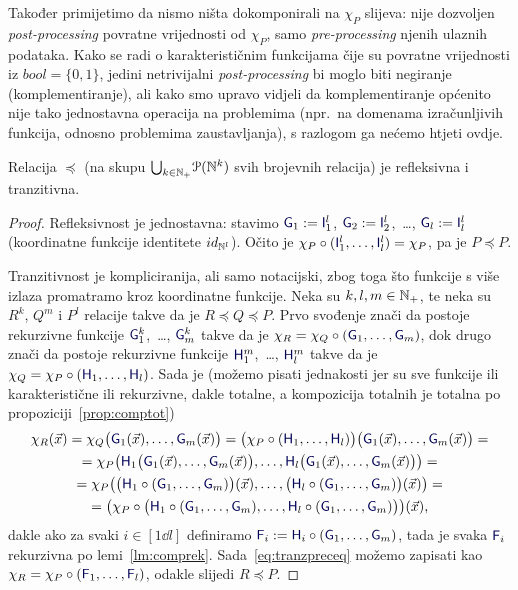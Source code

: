 Također primijetimo da nismo ništa dokomponirali na $\chi_P$ slijeva: nije dozvoljen \emph{post-processing} povratne vrijednosti od $\chi_P$, samo \emph{pre-processing} njenih ulaznih podataka. Kako se radi o karakterističnim funkcijama čije su povratne vrijednosti iz $bool=\{0,1\}$, jedini netrivijalni \emph{post-processing} bi moglo biti negiranje (komplementiranje), ali kako smo upravo vidjeli da komplementiranje općenito nije tako jednostavna operacija na problemima (npr.\ na domenama izračunljivih funkcija, odnosno problemima zaustavljanja), s razlogom ga nećemo htjeti ovdje.

\begin{propozicija}[{name=[refleksivnost i tranzitivnost svedivosti]}]\label{pp:preceqrt}
Relacija $\preceq$ (na skupu $\bigcup_{k\in{\mathbb N}_+}\!\mathcal P({\mathbb N}^k)$ svih brojevnih relacija) je refleksivna i tranzitivna.
\end{propozicija}
\begin{proof}
Refleksivnost je jednostavna: stavimo $\f G_1:=\f I_1^l$, $\f G_2:=\f I_2^l$,~\ldots, $\f G_l:=\f I_l^l$ (koordinatne funkcije identitete $id_{{\mathbb N}^l}$). Očito je $\chi_P\circ(\f I_1^l,\dotsc,\f I_l^l)=\chi_P$, pa je $P\preceq P$.

Tranzitivnost je kompliciranija, ali samo notacijski, zbog toga što funkcije s više izlaza promatramo kroz koordinatne funkcije. Neka su $k,l,m\in{\mathbb N}_+$, te neka su $R^k$, $Q^m$ i $P^l$ relacije takve da je $R\preceq Q\preceq P$. Prvo svođenje znači da postoje rekurzivne funkcije $\f G_1^k$,~\ldots, $\f G_m^k$ takve da je $\chi_R=\chi_Q\circ(\f G_1,\dotsc,\f G_m)$, dok drugo znači da postoje rekurzivne funkcije $\f H_1^m$,~\ldots, $\f H_l^m$ takve da je $\chi_Q=\chi_P\circ(\f H_1,\dotsc,\f H_l)$. Sada je (možemo pisati jednakosti jer su sve funkcije ili karakteristične ili rekurzivne, dakle totalne, a kompozicija totalnih je totalna po propoziciji~\ref{prop:comptot})
\begin{multline}\label{eq:tranzpreceq}
    \chi_R(\vec x)=\chi_Q\bigl(\f G_1(\vec x),\dotsc,\f G_m(\vec x)\bigr)=\bigl(\chi_P\circ(\f H_1,\dotsc,\f H_l)\bigr)\bigl(\f G_1(\vec x),\dotsc,\f G_m(\vec x)\bigr)=\\
    =\chi_P\bigl(
    \f H_1\bigl(\f G_1(\vec x),\dotsc,\f G_m(\vec x)\bigr),\dotsc,
    \f H_l\bigl(\f G_1(\vec x),\dotsc,\f G_m(\vec x)\bigr)
    \bigr)=\\
    =\chi_P\bigl(
    \bigl(\f H_1\circ(\f G_1,\dotsc,\f G_m)\bigr)(\vec x),\dotsc,
    \bigl(\f H_l\circ(\f G_1,\dotsc,\f G_m)\bigr)(\vec x)\bigr)=\\
    =\bigl(\chi_P\circ\bigl(\f H_1\circ(\f G_1,\dotsc,\f G_m),\dotsc,\f H_l\circ(\f G_1,\dotsc,\f G_m)\bigr)\bigr)(\vec x)\text,
\end{multline}
dakle ako za svaki $i\in[1\dd l]$ definiramo $\f F_i:=\f H_i\circ(\f G_1,\dotsc,\f G_m)$, tada je svaka $\f F_i$ rekurzivna po lemi~\ref{lm:comprek}. Sada~\eqref{eq:tranzpreceq} možemo zapisati kao $\chi_R=\chi_P\circ(\f F_1,\dotsc,\f F_l)$, odakle slijedi $R\preceq P$.
\end{proof}

